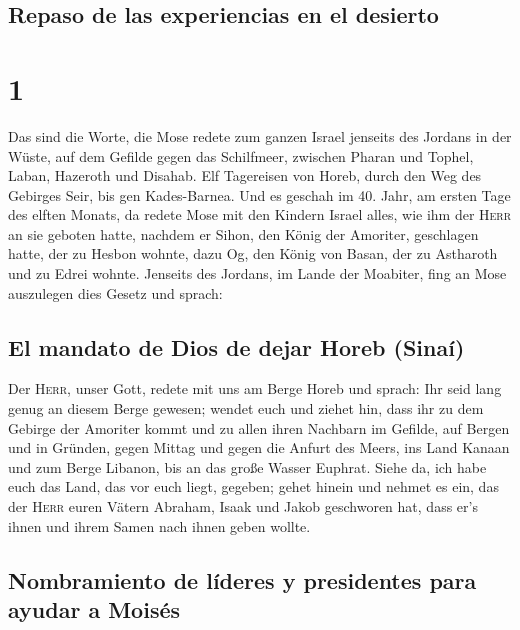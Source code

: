 \hypertarget{repaso-de-las-experiencias-en-el-desierto}{%
\subsection{Repaso de las experiencias en el
desierto}\label{repaso-de-las-experiencias-en-el-desierto}}

\hypertarget{section}{%
\section{1}\label{section}}

 Das sind die Worte, die Mose redete zum ganzen Israel
jenseits des Jordans in der Wüste, auf dem Gefilde gegen das Schilfmeer,
zwischen Pharan und Tophel, Laban, Hazeroth und Disahab. 
Elf Tagereisen von Horeb, durch den Weg des Gebirges Seir, bis gen
Kades-Barnea.  Und es geschah im 40. Jahr, am ersten Tage
des elften Monats, da redete Mose mit den Kindern Israel alles, wie ihm
der \textsc{Herr} an sie geboten hatte,  nachdem er Sihon,
den König der Amoriter, geschlagen hatte, der zu Hesbon wohnte, dazu Og,
den König von Basan, der zu Astharoth und zu Edrei wohnte.
 Jenseits des Jordans, im Lande der Moabiter, fing an Mose
auszulegen dies Gesetz und sprach:

\hypertarget{el-mandato-de-dios-de-dejar-horeb-sinauxed}{%
\subsection{El mandato de Dios de dejar Horeb
(Sinaí)}\label{el-mandato-de-dios-de-dejar-horeb-sinauxed}}

 Der \textsc{Herr}, unser Gott, redete mit uns am Berge
Horeb und sprach: Ihr seid lang genug an diesem Berge gewesen;
 wendet euch und ziehet hin, dass ihr zu dem Gebirge der
Amoriter kommt und zu allen ihren Nachbarn im Gefilde, auf Bergen und in
Gründen, gegen Mittag und gegen die Anfurt des Meers, ins Land Kanaan
und zum Berge Libanon, bis an das große Wasser Euphrat. 
Siehe da, ich habe euch das Land, das vor euch liegt, gegeben; gehet
hinein und nehmet es ein, das der \textsc{Herr} euren Vätern Abraham,
Isaak und Jakob geschworen hat, dass er's ihnen und ihrem Samen nach
ihnen geben wollte.

\hypertarget{nombramiento-de-luxedderes-y-presidentes-para-ayudar-a-moisuxe9s}{%
\subsection{Nombramiento de líderes y presidentes para ayudar a
Moisés}\label{nombramiento-de-luxedderes-y-presidentes-para-ayudar-a-moisuxe9s}}

